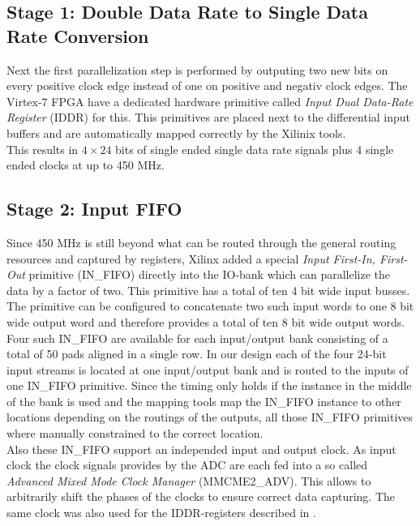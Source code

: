 \subsection{Stage 1: Double Data Rate to Single Data Rate Conversion}
\label{sec:fpga_adc_s1}
Next the first parallelization step is performed by outputing two new
bits on every positive clock edge instead of one on positive and negativ
clock edges. The Virtex-7 \gls{FPGA} have a dedicated hardware primitive
called {\em Input Dual Data-Rate Register} (IDDR) for this.
This primitives are placed next to the differential input buffers
and are automatically mapped correctly by the Xilinix tools. \\

This results in $4 \times 24$ bits of single ended single data rate
signals plus 4 single ended clocks at up to 450 MHz.

\subsection{Stage 2: Input FIFO}
Since 450 MHz is still beyond what can be routed through the general
routing resources and captured by registers, Xilinx added a special
{\em Input First-In, First-Out} primitive (IN\_FIFO)
directly into the IO-bank which can parallelize the data by a factor of two.
This primitive has a total of ten 4 bit wide input busses.
The primitive can be configured to concatenate two such input words
to one 8 bit wide output word and therefore provides a total of
ten 8 bit wide output words. \\

Four such IN\_FIFO are available for each
input/output bank consisting of a total of 50 pads aligned in a single row.
In our design each of the four 24-bit input streams is located at one
input/output bank and is routed to the inputs of one IN\_FIFO primitive.
Since the timing only holds if the instance in the middle of the bank
is used and the mapping tools map the IN\_FIFO instance to other
locations depending on the routings of the outputs, all those
IN\_FIFO primitives where manually constrained to the correct location. \\

Also these IN\_FIFO support an independed input and output clock.
As input clock the clock signals provides by the \gls{ADC} are each fed
into a so called {\em Advanced Mixed Mode Clock Manager} (MMCME2\_ADV).
This allows to arbitrarily shift the phases of the clocks to ensure
correct data capturing. The same clock was also used for the
IDDR-registers described in . \\

